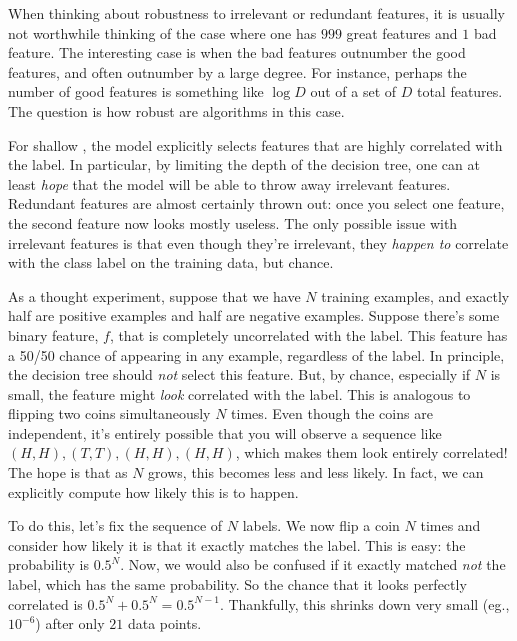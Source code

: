 When thinking about robustness to irrelevant or redundant features, it
is usually not worthwhile thinking of the case where one has $999$
great features and $1$ bad feature.  The interesting case is when the
bad features outnumber the good features, and often outnumber by a
large degree.  For instance, perhaps the number of good features is
something like $\log D$ out of a set of $D$ total features.  The
question is how robust are algorithms in this case.

For shallow , the model explicitly selects
features that are highly correlated with the label.  In particular, by
limiting the depth of the decision tree, one can at least \emph{hope}
that the model will be able to throw away irrelevant features.
Redundant features are almost certainly thrown out: once you select
one feature, the second feature now looks mostly useless.  The only
possible issue with irrelevant features is that even though they're
irrelevant, they \emph{happen to} correlate with the class label on
the training data, but chance.

As a thought experiment, suppose that we have $N$ training examples,
and exactly half are positive examples and half are negative
examples.  Suppose there's some binary feature, $f$, that is completely
uncorrelated with the label.  This feature has a 50/50 chance of
appearing in any example, regardless of the label.  In principle, the
decision tree should \emph{not} select this feature.  But, by chance,
especially if $N$ is small, the feature might \emph{look} correlated
with the label.  This is analogous to flipping two coins
simultaneously $N$ times.  Even though the coins are independent, it's
entirely possible that you will observe a sequence like $(H,H), (T,T),
(H,H), (H,H)$, which makes them look entirely correlated!  The hope is
that as $N$ grows, this becomes less and less likely.  In fact, we can
explicitly compute how likely this is to happen.

To do this, let's fix the sequence of $N$ labels.  We now flip a coin
$N$ times and consider how likely it is that it exactly matches the
label.  This is easy: the probability is $0.5^N$.  Now, we would also
be confused if it exactly matched \emph{not} the label, which has the
same probability.  So the chance that it looks perfectly correlated is
$0.5^N + 0.5^N = 0.5^{N-1}$.  Thankfully, this shrinks down very small
(eg., $10^{-6}$) after only $21$ data points.

